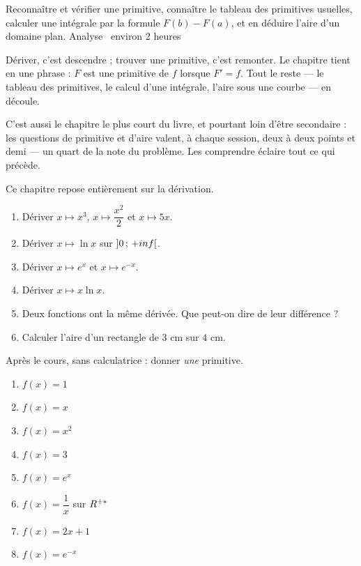   {Reconnaître et vérifier une primitive, connaître le tableau des primitives
   usuelles, calculer une intégrale par la formule $F(b)-F(a)$, et en déduire
   l'aire d'un domaine plan.}
  {Analyse \textbullet\ environ 2 heures}

Dériver, c'est descendre ; trouver une primitive, c'est remonter. Le chapitre
tient en une phrase : $F$ est une primitive de $f$ lorsque $F' = f$. Tout le
reste — le tableau des primitives, le calcul d'une intégrale, l'aire sous une
courbe — en découle.

C'est aussi le chapitre le plus court du livre, et pourtant loin d'être
secondaire : les questions de primitive et d'aire valent, à chaque session,
deux à deux points et demi — un quart de la note du problème. Les comprendre
éclaire tout ce qui précède.

\begin{revision}
Ce chapitre repose entièrement sur la dérivation.

\begin{enumerate}[label=\textbf{\arabic*.}, leftmargin=*, itemsep=0.35em]
  \item Dériver $x \mapsto x^{3}$, $x \mapsto \dfrac{x^{2}}{2}$ et
        $x \mapsto 5x$.
  \item Dériver $x \mapsto \ln x$ sur $\left]0\,;\,+inf\right[$.
  \item Dériver $x \mapsto e^{x}$ et $x \mapsto e^{-x}$.
  \item Dériver $x \mapsto x\ln x$.
  \item Deux fonctions ont la même dérivée. Que peut-on dire de leur
        différence ?
  \item Calculer l'aire d'un rectangle de $3$ cm sur $4$ cm.
\end{enumerate}
\end{revision}

\begin{automatismes}
Après le cours, sans calculatrice : donner \emph{une} primitive.

\begin{enumerate}[label=\textbf{\alph*)}, leftmargin=*, itemsep=0.25em]
  \item $f(x) = 1$
  \item $f(x) = x$
  \item $f(x) = x^{2}$
  \item $f(x) = 3$
  \item $f(x) = e^{x}$
  \item $f(x) = \dfrac1x$ sur $R^{+*}$
  \item $f(x) = 2x+1$
  \item $f(x) = e^{-x}$
\end{enumerate}
\end{automatismes}

